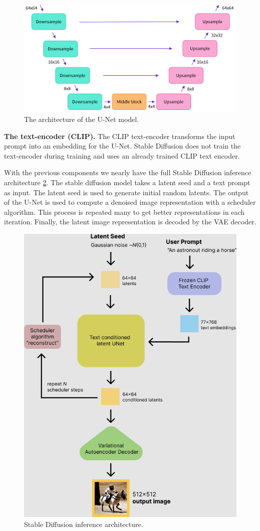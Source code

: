 \begin{figure}[ht]
    \centering
    \includegraphics[width=\linewidth]{images/diffusion/unet-model.png}
    \caption{The architecture of the U-Net model.}
    \label{fig:unet_model}
\end{figure}

\textbf{The text-encoder (CLIP).} The CLIP \cite{radford2021clip} text-encoder transforms the input prompt into an embedding for the U-Net. Stable Diffusion does not train the text-encoder during training and uses an already trained CLIP text encoder.

With the previous components we nearly have the full Stable Diffusion inference architecture \cref{fig:stable_diffusion}. The stable diffusion model takes a latent seed and a text prompt as input. The latent seed is  used to generate initial random latents. The output of the U-Net is used to compute a denoised image representation with a scheduler algorithm. This process is repeated many to get better representations in each iteration. Finally, the latent image representation is decoded by the VAE decoder.

\begin{figure}[ht]
    \centering
    \includegraphics[width=0.6\linewidth]{images/diffusion/stable_diffusion.png}
    \caption{Stable Diffusion inference architecture.}
    \label{fig:stable_diffusion}
\end{figure}

